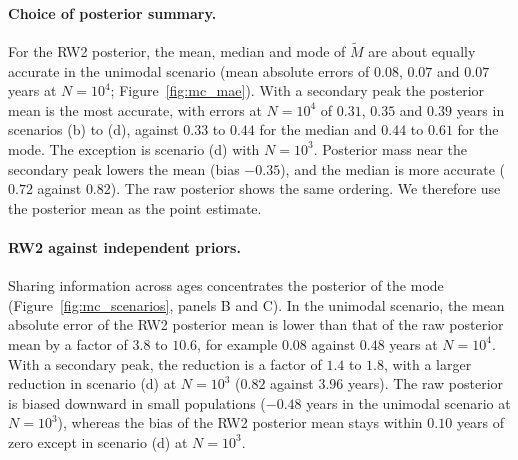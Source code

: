 \documentclass[12pt, letterpaper]{article}
\begin{document}
\paragraph{Choice of posterior summary.} For the RW2 posterior, the mean, median and mode of $\tilde{M}$ are about equally accurate in the unimodal scenario (mean absolute errors of $0.08$, $0.07$ and $0.07$ years at $N = 10^4$; Figure~\ref{fig:mc_mae}). With a secondary peak the posterior mean is the most accurate, with errors at $N = 10^4$ of $0.31$, $0.35$ and $0.39$ years in scenarios (b) to (d), against $0.33$ to $0.44$ for the median and $0.44$ to $0.61$ for the mode. The exception is scenario (d) with $N = 10^3$. Posterior mass near the secondary peak lowers the mean (bias $-0.35$), and the median is more accurate ($0.72$ against $0.82$). The raw posterior shows the same ordering. We therefore use the posterior mean as the point estimate.

\paragraph{RW2 against independent priors.} Sharing information across ages concentrates the posterior of the mode (Figure~\ref{fig:mc_scenarios}, panels B and C). In the unimodal scenario, the mean absolute error of the RW2 posterior mean is lower than that of the raw posterior mean by a factor of $3.8$ to $10.6$, for example $0.08$ against $0.48$ years at $N = 10^4$. With a secondary peak, the reduction is a factor of $1.4$ to $1.8$, with a larger reduction in scenario (d) at $N = 10^3$ ($0.82$ against $3.96$ years). The raw posterior is biased downward in small populations ($-0.48$ years in the unimodal scenario at $N = 10^3$), whereas the bias of the RW2 posterior mean stays within $0.10$ years of zero except in scenario (d) at $N = 10^3$.
\end{document}
